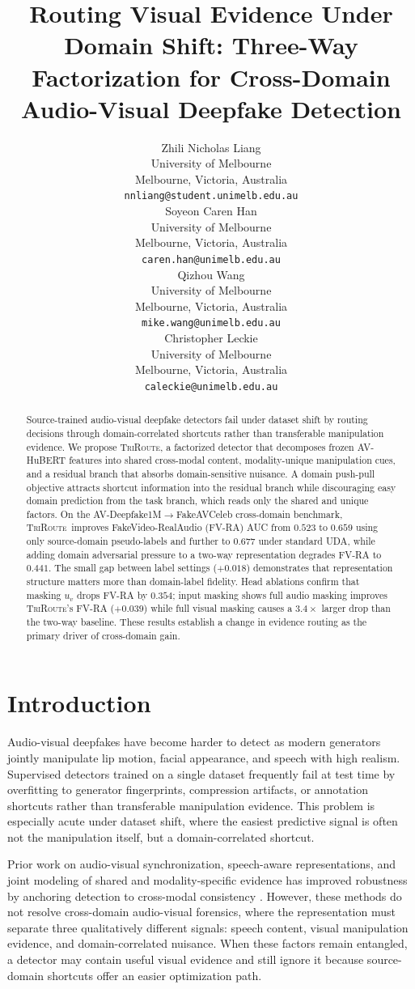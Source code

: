 \documentclass{article}
\title{Routing Visual Evidence Under Domain Shift: Three-Way Factorization for Cross-Domain Audio-Visual Deepfake Detection}
\author{%
  Zhili Nicholas Liang \\
  University of Melbourne \\
  Melbourne, Victoria, Australia \\
  \texttt{nnliang@student.unimelb.edu.au} \\
  \And
  Soyeon Caren Han \\
  University of Melbourne \\
  Melbourne, Victoria, Australia \\
  \texttt{caren.han@unimelb.edu.au} \\
  \And
  Qizhou Wang \\
  University of Melbourne \\
  Melbourne, Victoria, Australia \\
  \texttt{mike.wang@unimelb.edu.au} \\
  \And
  Christopher Leckie \\
  University of Melbourne \\
  Melbourne, Victoria, Australia \\
  \texttt{caleckie@unimelb.edu.au} \\
}
\newcommand{\method}{\textsc{TriRoute}}
\begin{document}
\maketitle

\begin{abstract}
Source-trained audio-visual deepfake detectors fail under dataset shift by routing decisions through domain-correlated shortcuts rather than transferable manipulation evidence. We propose \method, a factorized detector that decomposes frozen AV-HuBERT features into shared cross-modal content, modality-unique manipulation cues, and a residual branch that absorbs domain-sensitive nuisance. A domain push-pull objective attracts shortcut information into the residual branch while discouraging easy domain prediction from the task branch, which reads only the shared and unique factors. On the AV-Deepfake1M$\rightarrow$FakeAVCeleb cross-domain benchmark, \method\ improves FakeVideo-RealAudio (FV-RA) AUC from $0.523$ to $0.659$ using only source-domain pseudo-labels and further to $0.677$ under standard UDA, while adding domain adversarial pressure to a two-way representation degrades FV-RA to $0.441$. The small gap between label settings ($+0.018$) demonstrates that representation structure matters more than domain-label fidelity. Head ablations confirm that masking $u_v$ drops FV-RA by $0.354$; input masking shows full audio masking improves \method's FV-RA ($+0.039$) while full visual masking causes a $3.4\times$ larger drop than the two-way baseline. These results establish a change in evidence routing as the primary driver of cross-domain gain.
\end{abstract}

\section{Introduction}

Audio-visual deepfakes have become harder to detect as modern generators jointly manipulate lip motion, facial appearance, and speech with high realism. Supervised detectors trained on a single dataset frequently fail at test time by overfitting to generator fingerprints, compression artifacts, or annotation shortcuts rather than transferable manipulation evidence. This problem is especially acute under dataset shift, where the easiest predictive signal is often not the manipulation itself, but a domain-correlated shortcut.

Prior work on audio-visual synchronization, speech-aware representations, and joint modeling of shared and modality-specific evidence has improved robustness by anchoring detection to cross-modal consistency \citep{feng2023avad, liang2024speechforensics, smeu2025avhalign, du2025cad}. However, these methods do not resolve cross-domain audio-visual forensics, where the representation must separate three qualitatively different signals: speech content, visual manipulation evidence, and domain-correlated nuisance. When these factors remain entangled, a detector may contain useful visual evidence and still ignore it because source-domain shortcuts offer an easier optimization path.
\end{document}
